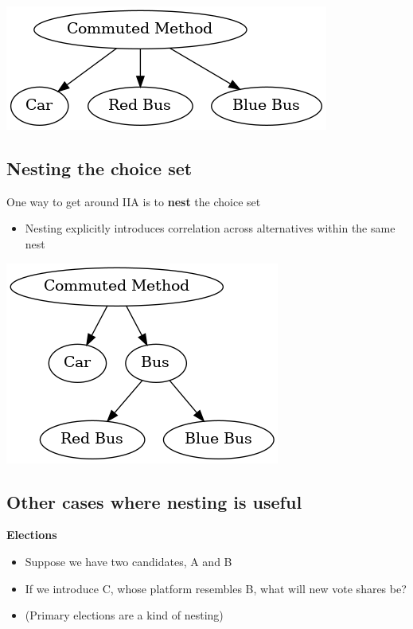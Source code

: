 \documentclass[11pt]{article}
\begin{document}
\begin{center}
\includegraphics[width=.9\linewidth]{unnested.png}
\end{center}


\subsection{Nesting the choice set}
\label{sec:orgdb56363}
One way to get around IIA is to \textbf{nest} the choice set
\begin{itemize}
\item Nesting explicitly introduces correlation across alternatives within the same nest
\end{itemize}


\begin{center}
\includegraphics[width=.9\linewidth]{nested.png}
\end{center}


\subsection{Other cases where nesting is useful}
\label{sec:orgab23ed6}

\textbf{Elections}

\begin{itemize}
\item Suppose we have two candidates, A and B
\item If we introduce C, whose platform resembles B, what will new vote shares be?
\item (Primary elections are a kind of nesting)
\end{itemize}
\end{document}
